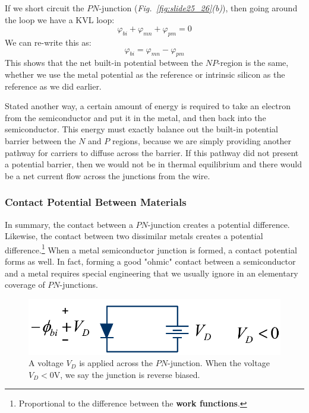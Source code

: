 If we short circuit the $PN$-junction \big(\emph{Fig.~\ref{fig:slide25_26}(b)}\big), then going around the loop we have a KVL loop:
    \begin{equation}
        \varphi_{bi} + \varphi_{mn} + \varphi_{pm} = 0
    \end{equation}
We can re-write this as:
    \begin{equation}
        \varphi_{bi} =  \varphi_{mn} - \varphi_{pm} 
    \end{equation}
This shows that the net built-in potential between the $NP$-region is the same, whether we use the metal potential as the reference or intrinsic silicon as the reference as we did earlier.  

Stated another way, a certain amount of energy is required to take an electron from the semiconductor and put it in the metal, and then back into the semiconductor.  This energy must exactly balance out the built-in potential barrier between the $N$ and $P$ regions, because we are simply providing another pathway for carriers to diffuse across the barrier.  If this pathway did not present a potential barrier,  then we would not be in thermal equilibrium and there would be a net current flow across the junctions from the wire.
\subsubsection{Contact Potential Between Materials}
In summary, the contact between a $PN$-junction creates a potential difference.    Likewise, the contact between two dissimilar metals creates a potential difference.\footnote{Proportional to the difference between the \textbf{work functions}.}   When a metal semiconductor junction is formed, a contact potential forms as well.  In fact, forming a good "ohmic" contact between a semiconductor and a metal requires special engineering that we usually ignore in an elementary coverage of $PN$-junctions.   
\newpage
\begin{figure}[t]
\centering
\includegraphics[width=.65\columnwidth]{slide28}
\caption{A voltage $V_D$ is applied across the $PN$-junction.  When the voltage $V_D < 0$V, we say the junction is reverse biased.}
\label{fig:slide28}
\end{figure}
